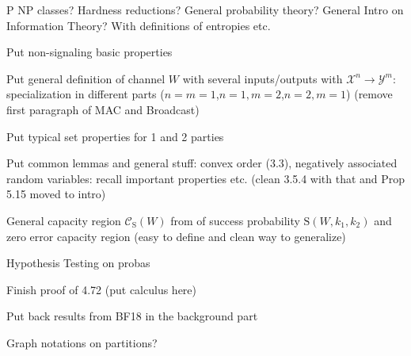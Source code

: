 P NP classes?
Hardness reductions?
General probability theory?
General Intro on Information Theory? With definitions of entropies etc. 

Put non-signaling basic properties

Put general definition of channel $W$ with several inputs/outputs with $\mathcal{X}^n \rightarrow \mathcal{Y}^m$: specialization in different parts ($n=m=1$,$n=1,m=2$,$n=2,m=1$) (remove first paragraph of MAC and Broadcast)

Put typical set properties for 1 and 2 parties

Put common lemmas and general stuff: convex order (3.3), negatively associated random variables: recall important properties etc. (clean 3.5.4 with that and Prop 5.15 moved to intro)

General capacity region $\mathcal{C}_{\textrm{S}}(W)$ from of success probability $\textrm{S}(W,k_1,k_2)$ and zero error capacity region (easy to define and clean way to generalize)

Hypothesis Testing on probas

Finish proof of 4.72 (put calculus here)

Put back results from BF18 in the background part

Graph notations on partitions?
